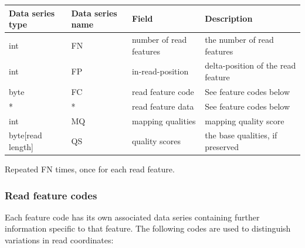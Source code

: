 \documentclass[a4paper]{article}
\begin{document}
\begin{threeparttable}[t]
\begin{tabular}{|>{\raggedright}p{88pt}|>{\raggedright}p{83pt}|>{\raggedright}p{85pt}|>{\raggedright}p{180pt}|}
\hline
\textbf{Data series type} & \textbf{Data series name} & \textbf{Field} & \textbf{Description}\tabularnewline
\hline
int & FN & number of read features & the number of read features\tabularnewline
\hline
int & FP & in-read-position\tnote{a} & delta-position of the read feature\tabularnewline 
\hline
byte & FC & read feature code\tnote{a} & See feature codes below\tabularnewline
\hline
* & * & read feature data\tnote{a} & See feature codes below\tabularnewline
\hline
int & MQ & mapping qualities & mapping quality score\tabularnewline
\hline
byte[read length] & QS & quality scores & the base qualities, if preserved\tabularnewline
\hline
\end{tabular}
\begin{tablenotes}
\item[a] Repeated FN times, once for each read feature.
\end{tablenotes}
\end{threeparttable}

\subsubsection*{Read feature codes}

Each feature code has its own associated data series containing further information specific to that feature.
The following codes are used to distinguish variations in read coordinates:
\end{document}
